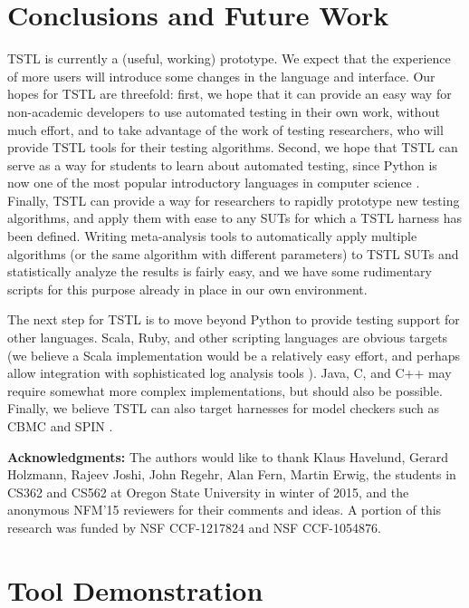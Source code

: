 \documentclass{sig-alternate}
\begin{document}
\section{Conclusions and Future Work}

TSTL is currently a (useful, working) prototype.  We expect that the
experience of more users will introduce some changes in the language
and interface.  Our hopes for TSTL are threefold:  first, we hope that
it can provide an easy way for non-academic developers to use
automated testing in their own work, without much effort, and to take
advantage of the work of testing researchers, who will provide TSTL
tools for their testing algorithms.  Second, we hope that TSTL can
serve as a way for students to learn about automated testing, since
Python is now one of the most popular introductory languages in
computer science \cite{PythonPop}.  Finally, TSTL can provide a way for researchers to
rapidly prototype new testing algorithms, and apply them with ease to
any SUTs for which a TSTL harness has been defined.  Writing
meta-analysis tools to automatically apply multiple algorithms (or the
same algorithm with different parameters) to TSTL SUTs and
statistically analyze the results is fairly easy, and we have some
rudimentary scripts for this purpose already in place in our own
environment.

The next step for TSTL is to move beyond Python to provide testing
support for other languages.  Scala, Ruby, and other scripting
languages are obvious targets (we believe a Scala implementation would
be a relatively easy effort, and perhaps allow integration with
sophisticated log analysis tools \cite{KlausTool}).  Java, C, and C++
may require somewhat more complex implementations, but should also be
possible.  Finally, we believe TSTL can also target harnesses for
model checkers such as CBMC \cite{CBMCp} and SPIN \cite{SPIN}.

{\bf Acknowledgments:} The authors would like to thank Klaus Havelund,
Gerard Holzmann, Rajeev Joshi, John Regehr, Alan Fern, Martin Erwig,
the students in CS362 and CS562 at Oregon State University in winter
of 2015, and the anonymous NFM'15 reviewers for their comments and
ideas.  A portion of this research was funded by NSF CCF-1217824 and
NSF CCF-1054876.




\newpage

\appendix

\section{Tool Demonstration}
\end{document}
